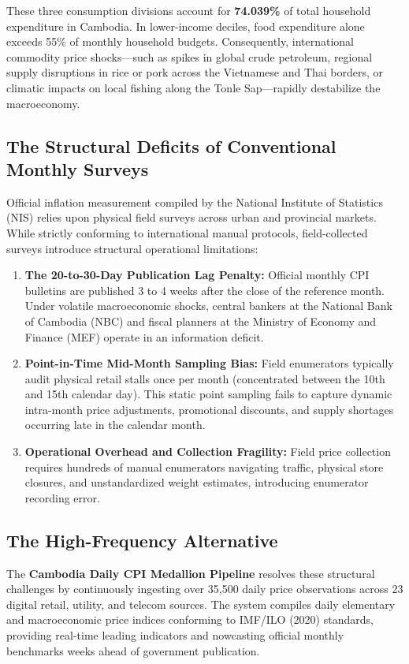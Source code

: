 \documentclass[11pt,a4paper,oneside]{article}
\begin{document}
These three consumption divisions account for \textbf{74.039\%} of total household expenditure in Cambodia. In lower-income deciles, food expenditure alone exceeds 55\% of monthly household budgets. Consequently, international commodity price shocks—such as spikes in global crude petroleum, regional supply disruptions in rice or pork across the Vietnamese and Thai borders, or climatic impacts on local fishing along the Tonle Sap—rapidly destabilize the macroeconomy.

\subsection{The Structural Deficits of Conventional Monthly Surveys}
Official inflation measurement compiled by the National Institute of Statistics (NIS) relies upon physical field surveys across urban and provincial markets. While strictly conforming to international manual protocols, field-collected surveys introduce structural operational limitations:
\begin{enumerate}
    \item \textbf{The 20-to-30-Day Publication Lag Penalty:} Official monthly CPI bulletins are published 3 to 4 weeks after the close of the reference month. Under volatile macroeconomic shocks, central bankers at the National Bank of Cambodia (NBC) and fiscal planners at the Ministry of Economy and Finance (MEF) operate in an information deficit.
    \item \textbf{Point-in-Time Mid-Month Sampling Bias:} Field enumerators typically audit physical retail stalls once per month (concentrated between the 10th and 15th calendar day). This static point sampling fails to capture dynamic intra-month price adjustments, promotional discounts, and supply shortages occurring late in the calendar month.
    \item \textbf{Operational Overhead and Collection Fragility:} Field price collection requires hundreds of manual enumerators navigating traffic, physical store closures, and unstandardized weight estimates, introducing enumerator recording error.
\end{enumerate}

\subsection{The High-Frequency Alternative}
The \textbf{Cambodia Daily CPI Medallion Pipeline} resolves these structural challenges by continuously ingesting over 35,500 daily price observations across 23 digital retail, utility, and telecom sources. The system compiles daily elementary and macroeconomic price indices conforming to IMF/ILO (2020) standards, providing real-time leading indicators and nowcasting official monthly benchmarks weeks ahead of government publication.
\end{document}

